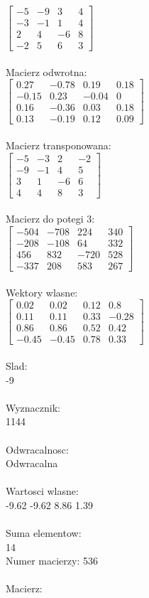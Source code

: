 \documentclass[a4paper,12pt]{article}
\begin{document}
$\begin{bmatrix} -5&-9&3&4\\-3&-1&1&4\\2&4&-6&8\\-2&5&6&3 \end{bmatrix}$
\\
\\
Macierz odwrotna:\\

$\begin{bmatrix} 0.27&-0.78&0.19&0.18\\-0.15&0.23&-0.04&0\\0.16&-0.36&0.03&0.18\\0.13&-0.19&0.12&0.09 \end{bmatrix}$
\\
\\
Macierz transponowana:\\

$\begin{bmatrix} -5&-3&2&-2\\-9&-1&4&5\\3&1&-6&6\\4&4&8&3 \end{bmatrix}$
\\
\\
Macierz do potegi 3:\\

$\begin{bmatrix} -504&-708&224&340\\-208&-108&64&332\\456&832&-720&528\\-337&208&583&267 \end{bmatrix}$
\\
\\
Wektory wlasne:\\

$\begin{bmatrix} 0.02&0.02&0.12&0.8\\0.11&0.11&0.33&-0.28\\0.86&0.86&0.52&0.42\\-0.45&-0.45&0.78&0.33 \end{bmatrix}$
\\
\\
Slad:\\
-9
\\
\\
Wyznacznik:\\
1144
\\
\\
Odwracalnosc:\\
Odwracalna
\\
\\
Wartosci wlasne:\\
-9.62 -9.62 8.86 1.39
\\
\\
Suma elementow:\\
14
\\
\newpage
Numer macierzy:
536
\\
\\
Macierz:\\
\end{document}
